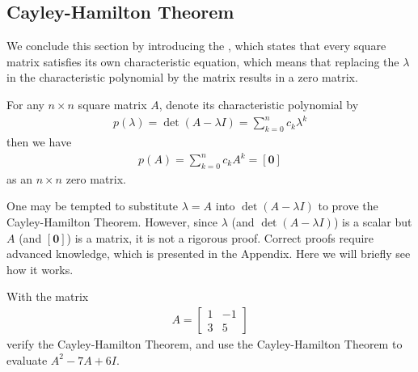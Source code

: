 \subsection{Cayley-Hamilton Theorem}
We conclude this section by introducing the , which states that every square matrix satisfies its own characteristic equation, which means that replacing the $\lambda$ in the characteristic polynomial by the matrix results in a zero matrix.
\begin{thm}
For any $n \times n$ square matrix $A$, denote its characteristic polynomial by
\begin{align*}
p(\lambda) = \det(A-\lambda I) = \sum_{k=0}^{n} c_k \lambda^k
\end{align*}
then we have
\begin{align*}
p(A) = \sum_{k=0}^{n} c_k A^k = [\textbf{0}]
\end{align*}
as an $n \times n$ zero matrix.
\end{thm}
One may be tempted to substitute $\lambda = A$ into $\det(A-\lambda I)$ to prove the Cayley-Hamilton Theorem. However, since $\lambda$ (and $\det(A-\lambda I)$) is a scalar but $A$ (and $[\textbf{0}]$) is a matrix, it is not a rigorous proof. Correct proofs require advanced knowledge, which is presented in the Appendix. Here we will briefly see how it works.
\begin{exmp}
With the matrix
\begin{align*}
A = 
\begin{bmatrix}
1 & -1 \\
3 & 5
\end{bmatrix}
\end{align*}
verify the Cayley-Hamilton Theorem, and use the Cayley-Hamilton Theorem to evaluate $A^2 - 7A + 6I$.
\end{exmp}
